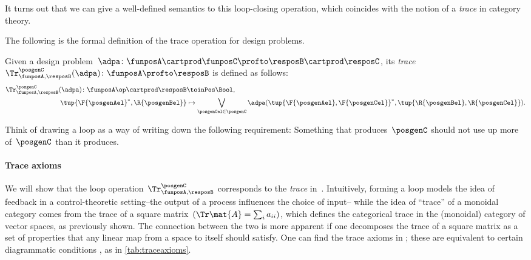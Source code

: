 It turns out that we can give a well-defined semantics to this loop-closing operation, which coincides with the notion of a \emph{trace} in category theory.

The following is the formal definition of the trace operation for design problems.

\begin{definition}
    \label{def:dp-trace}
    Given a design problem~$\adpa\colon \funposA \cartprod \funposC \profto \resposB \cartprod \resposC$, its \emph{trace}~$\Tr_{\funposA,\resposB}^\posgenC(\adpa) \colon \funposA \profto \resposB$ is defined as follows:
    \begin{equation}
        \label{eq:tracedef}
        \begin{aligned}
            \Tr_{\funposA,\resposB}^\posgenC(\adpa) \colon  \funposA\op \cartprod \resposB & \toinPos \Bool,                           \\
            \tup{\F{\posgenAel}^*, \R{\posgenBel}}                                         & \mapsto \bigvee_{\posgenCel \in \posgenC} 
            \adpa(\tup{\F{\posgenAel}, \F{\posgenCel}}^*,
            \tup{\R{\posgenBel}, \R{\posgenCel}}). 
        \end{aligned}
    \end{equation}
\end{definition}

Think of drawing a loop as a way of writing down the following requirement: Something that produces~$\posgenC$ should not use up more of~$\posgenC$ than it produces.


\paragraph{Trace axioms}
We will show that the loop operation~$\Tr_{\funposA,\resposB}^\posgenC$ corresponds to the \emph{trace} in~\DP.
Intuitively, forming a loop models the idea of feedback in a control-theoretic setting--the output of a process influences the choice of input--
while the idea of ``trace'' of a monoidal category comes from the trace of a square matrix~$(\Tr\mat{A} = \sum_i a_{ii})$, which defines the categorical trace in the (monoidal) category of vector spaces, as previously shown.
The connection between the two is more apparent if one decomposes the trace of a square matrix as a set of properties that any linear map from a space to itself should satisfy.
One can find the trace axioms in  \cite{mac2013categories};
these are equivalent to certain diagrammatic conditions \cite{joyal96}, as in \cref{tab:traceaxioms}.

